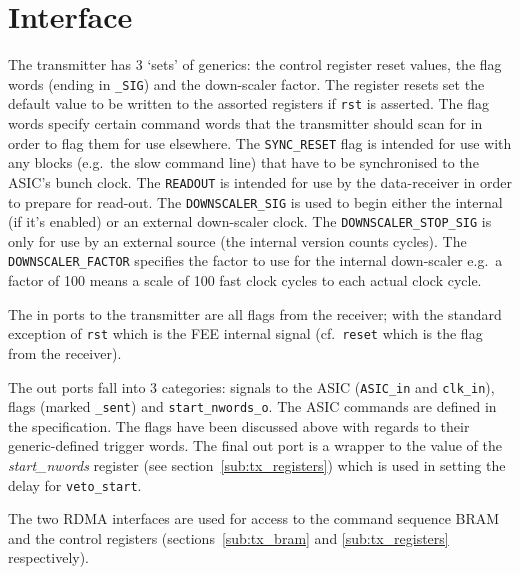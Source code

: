 \documentclass[]{report}
\begin{document}
    \section{Interface} %
    \label{sub:tx_interface}
    The transmitter has 3 `sets' of generics: the control register reset values, the flag words (ending in \texttt{\_SIG}) and the down-scaler factor. The register resets set the default value to be written to the assorted registers if \texttt{rst} is asserted. The flag words specify certain command words that the transmitter should scan for in order to flag them for use elsewhere. The \texttt{\texttt{SYNC\_RESET}} flag is intended for use with any blocks (e.g.\ the slow command line) that have to be synchronised to the ASIC's bunch clock. The \texttt{READOUT} is intended for use by the data-receiver in order to prepare for read-out. The \texttt{DOWNSCALER\_SIG} is used to begin either the internal (if it's enabled) or an external down-scaler clock. The \texttt{DOWNSCALER\_STOP\_SIG} is only for use by an external source (the internal version counts cycles). The \texttt{DOWNSCALER\_FACTOR} specifies the factor to use for the internal down-scaler e.g.\ a factor of 100 means a scale of 100 fast clock cycles to each actual clock cycle.
    
    The in ports to the transmitter are all flags from the receiver; with the standard exception of \texttt{rst} which is the FEE internal signal (cf.\ \texttt{reset} which is the flag from the receiver).
    
    The out ports fall into 3 categories: signals to the ASIC (\texttt{ASIC\_in} and \texttt{clk\_in}), flags (marked \texttt{\_sent}) and \texttt{start\_nwords\_o}. The ASIC commands are defined in the specification. The flags have been discussed above with regards to their generic-defined trigger words. The final out port is a wrapper to the value of the \emph{start\_nwords} register (see section~\ref{sub:tx_registers}) which is used in setting the delay for \texttt{veto\_start}.
    
    The two RDMA interfaces are used for access to the command sequence BRAM and the control registers (sections~\ref{sub:tx_bram} and \ref{sub:tx_registers} respectively).
    
\end{document}
